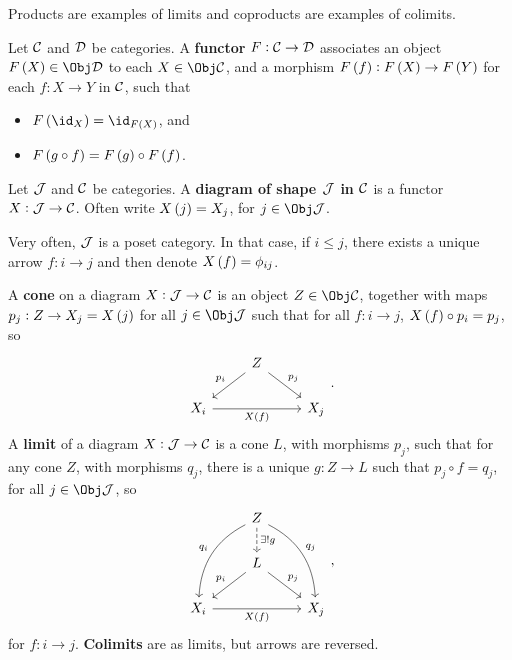 Products are examples of limits and coproducts are examples of colimits.

\pagebreak

\begin{definition}
Let $ \mathcal{C} $ and $ \mathcal{D} $ be categories. A \textbf{functor} $ F : \mathcal{C} \to \mathcal{D} $ associates an object $ F\br{X} \in \Obj \DDD $ to each $ X \in \Obj \CCC $, and a morphism $ F\br{f} : F\br{X} \to F\br{Y} $ for each $ f : X \to Y $ in $ \mathcal{C} $, such that
\begin{itemize}
\item $ F\br{\id_X} = \id_{F\br{X}} $, and
\item $ F\br{g \circ f} = F\br{g} \circ F\br{f} $.
\end{itemize}
\end{definition}

\begin{definition}
Let $ \mathcal{J} $ and $ \mathcal{C} $ be categories. A \textbf{diagram of shape $ \mathcal{J} $ in $ \mathcal{C} $} is a functor $ X : \mathcal{J} \to \mathcal{C} $. Often write $ X\br{j} = X_j $, for $ j \in \Obj \JJJ $.
\end{definition}

Very often, $ \mathcal{J} $ is a poset category. In that case, if $ i \le j $, there exists a unique arrow $ f : i \to j $ and then denote $ X\br{f} = \phi_{ij} $.

\begin{definition}
A \textbf{cone} on a diagram $ X : \mathcal{J} \to \mathcal{C} $ is an object $ Z \in \Obj \CCC $, together with maps $ p_j : Z \to X_j = X\br{j} $ for all $ j \in \Obj \JJJ $ such that for all $ f : i \to j $, $ X\br{f} \circ p_i = p_j $, so
$$
\begin{tikzcd}
& Z \arrow{dl}[swap]{p_i} \arrow{dr}{p_j} & \\
X_i \arrow{rr}[swap]{X\br{f}} & & X_j
\end{tikzcd}.
$$
A \textbf{limit} of a diagram $ X : \mathcal{J} \to \mathcal{C} $ is a cone $ L $, with morphisms $ p_j $, such that for any cone $ Z $, with morphisms $ q_j $, there is a unique $ g : Z \to L $ such that $ p_j \circ f = q_j $, for all $ j \in \Obj \JJJ $, so
$$
\begin{tikzcd}
& Z \arrow[dashed]{d}{\exists !g} \arrow[bend right=30]{ddl}[swap]{q_i} \arrow[bend left=30]{ddr}{q_j} & \\
& L \arrow{dl}[swap]{p_i} \arrow{dr}{p_j} & \\
X_i \arrow{rr}[swap]{X\br{f}} & & X_j
\end{tikzcd},
$$
for $ f : i \to j $. \textbf{Colimits} are as limits, but arrows are reversed.
\end{definition}

